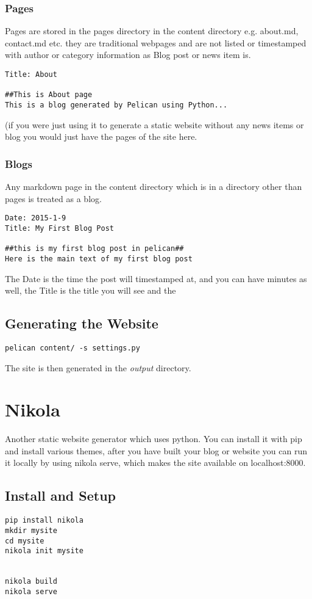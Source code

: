 \documentclass[12pt]{article}			%
\begin{document}
\subsubsection{Pages}
Pages are stored in the pages directory in the content directory e.g. about.md, contact.md etc. they are traditional webpages and are not listed or timestamped with author or category information as Blog post or news item is.

\begin{verbatim}
Title: About

##This is About page
This is a blog generated by Pelican using Python...
\end{verbatim}
(if you were just using it to generate a static website without any news items or blog you would just have the pages of the site here.

\subsubsection{Blogs}
Any markdown page in the content directory which is in a directory other than pages is treated as a blog.

\begin{verbatim}
Date: 2015-1-9
Title: My First Blog Post

##this is my first blog post in pelican##
Here is the main text of my first blog post

\end{verbatim}
The Date is the time the post will timestamped at, and you can have minutes as well, the Title is the title you will see and the
\subsection{Generating the Website}
\begin{verbatim}
pelican content/ -s settings.py
\end{verbatim}
The site is then generated in the \textit{output} directory.


\newpage
\section{Nikola}
Another static website generator which uses python. You can install it with pip and install various themes, after you have built your blog or website you can run it locally by using nikola serve, which makes the site available on localhost:8000.

\subsection{Install and Setup}
\begin{verbatim}
pip install nikola
mkdir mysite
cd mysite
nikola init mysite


nikola build
nikola serve 
\end{verbatim}
\end{document}
